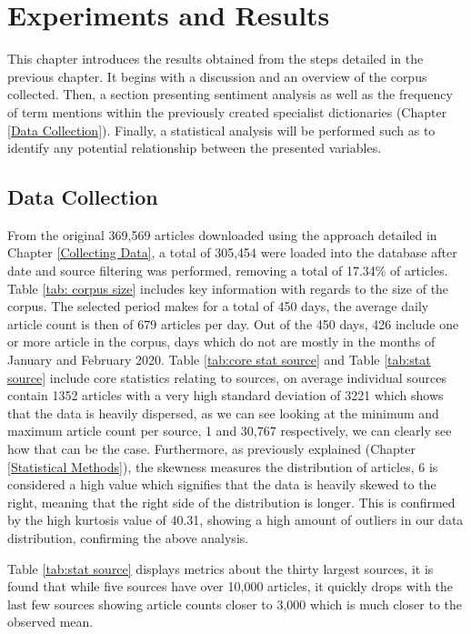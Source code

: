 \chapter{Experiments and Results}\label{Evalutation}

This chapter introduces the results obtained from the steps detailed in the previous chapter. It begins with a discussion and an overview of the corpus collected. Then, a section presenting sentiment analysis as well as the frequency of term mentions within the previously created specialist dictionaries (Chapter \ref{Data Collection}). Finally, a statistical analysis will be performed such as to identify any potential relationship between the presented variables. 

\section{Data Collection}

From the original 369,569 articles downloaded using the approach detailed in Chapter \ref{Collecting Data}, a total of 305,454 were loaded into the database after date and source filtering was performed, removing a total of 17.34\% of articles. Table \ref{tab: corpus size} includes key information with regards to  the size of the corpus. The selected period makes for a total of 450 days, the average daily article count is then of 679 articles per day. Out of the 450 days, 426 include one or more article in the corpus, days which do not are mostly in the months of January and February 2020. Table \ref{tab:core stat source} and Table \ref{tab:stat source} include core statistics relating to sources, on average individual sources contain 1352 articles with a very high standard deviation of 3221 which shows that the data is heavily dispersed, as we can see looking at the minimum and maximum article count per source, 1 and 30,767 respectively, we can clearly see how that can be the case. Furthermore, as previously explained (Chapter \ref{Statistical Methods}), the skewness measures the distribution of articles, 6 is considered a high value which signifies that the data is heavily skewed to the right, meaning that the right side of the distribution is longer. This is confirmed by the high kurtosis value of 40.31, showing a high amount of outliers in our data distribution, confirming the above analysis.

Table \ref{tab:stat source} displays metrics about the thirty largest sources, it is found that while five sources have over 10,000 articles, it quickly drops with the last few sources showing article counts closer to 3,000 which is much closer to the observed mean.

